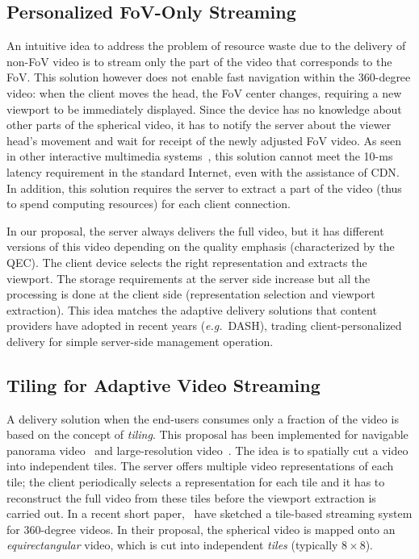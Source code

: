 \subsection{Personalized FoV-Only Streaming}

An intuitive idea to address the problem of resource waste due to the delivery of non-FoV video
is to stream only the part of the video that corresponds to the \ac{FoV}. This solution however
does not enable fast navigation within the 360-degree video: when the client moves the head,
the FoV
center changes, requiring a new viewport to be immediately displayed. Since
the device has no knowledge about other parts of the spherical video, it has to notify
the server about the viewer head's movement and wait for receipt of the newly
adjusted FoV video. As seen in other interactive multimedia systems~\cite{ChoyWSR14},
this solution cannot meet the 10-ms latency requirement in the standard Internet, even
with the assistance of \ac{CDN}. In addition, this solution requires the server to extract
a part of the video (thus to spend computing resources) for each
client connection.

 In our proposal, the server always delivers the full video, but it
has different versions of this video depending on the quality emphasis (characterized by the QEC).
The client
device selects the right representation and extracts the viewport. The storage
requirements at the
server side increase but all the processing is done at the client side (representation selection
and viewport extraction).
This idea matches the adaptive delivery solutions
that content providers have adopted in recent years (\textit{e.g.}~\ac{DASH}),
trading client-personalized delivery for simple server-side management operation.

\subsection{Tiling for Adaptive Video Streaming}

A delivery solution when the end-users consumes only a fraction of the video is based on the concept of \emph{tiling}.
This proposal has been implemented for navigable panorama
video~\cite{sanchez_compressed_2015,wang_mixing_2014,gaddam_tiling_2015} and
large-resolution video~\cite{jean16mmsys}.
The idea is to spatially cut a video into independent tiles. The server offers
multiple video representations of each tile; the client periodically selects a representation
for each tile
and it has to reconstruct
the full video from these tiles before the viewport extraction is carried out. In a recent short
paper,~\citet{ochi_live_2015} have sketched a tile-based streaming system for 360-degree
videos.
In their proposal, the spherical video is mapped onto an \emph{equirectangular} video, which
is cut into independent \emph{tiles} (typically $8\times 8$).

